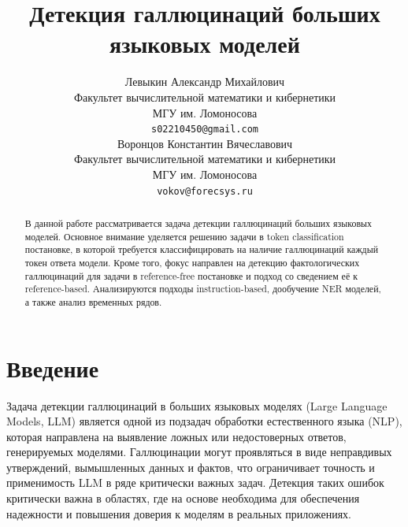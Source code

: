 \documentclass[12pt]{article}
\title{Детекция галлюцинаций больших языковых моделей}
\author{ Левыкин Александр Михайлович \\
        Факультет вычислительной математики и кибернетики \\
        МГУ им. Ломоносова \\
        \texttt{s02210450@gmail.com} \\
	\And
	Воронцов Константин Вячеславович \\
        Факультет вычислительной математики и кибернетики \\
        МГУ им. Ломоносова \\
        \texttt{vokov@forecsys.ru} \\
}
\date{}
\begin{document}
\maketitle

\begin{abstract}
В данной работе рассматривается задача детекции галлюцинаций больших языковых моделей. Основное внимание уделяется решению задачи в token classification постановке, в которой требуется классифицировать на наличие галлюцинаций каждый токен ответа модели. Кроме того, фокус направлен на детекцию фактологических галлюцинаций для задачи в reference-free постановке и подход со сведением её к reference-based. Анализируются подходы instruction-based, дообучение NER моделей, а также анализ временных рядов. %

%
\end{abstract}


\section{Введение}
Задача детекции галлюцинаций в больших языковых моделях (Large Language Models, LLM) является одной из подзадач обработки естественного языка (NLP), которая направлена на выявление ложных или недостоверных ответов, генерируемых моделями. Галлюцинации могут проявляться в виде неправдивых утверждений, вымышленных данных и фактов, что ограничивает точность и применимость LLM в ряде критически важных задач. Детекция таких ошибок критически важна в областях, где на основе необходима для обеспечения надежности и повышения доверия к моделям в реальных приложениях.
\end{document}
